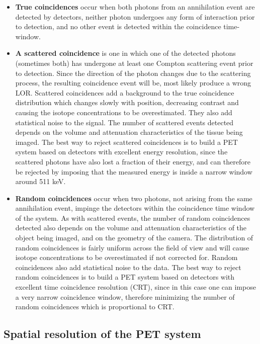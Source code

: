 \begin{itemize}
\item {\bf True coincidences} occur when both photons from an annihilation event are detected by detectors, neither photon undergoes any form of interaction prior to detection, and no other event is detected within the coincidence time-window.
\item {\bf A scattered coincidence} is one in which one of the detected photons (sometimes both) has undergone at least one Compton scattering event prior to detection. Since the direction of the photon changes due to the scattering process, the resulting coincidence event will be, most likely produce a wrong LOR. Scattered coincidences add a background to the true coincidence distribution which changes slowly with position, decreasing contrast and causing the isotope concentrations to be overestimated. They also add statistical noise to the signal. The number of scattered events detected depends on the volume and attenuation characteristics of the tissue being imaged. The best way to reject scattered coincidences is to build a PET system based on detectors with excellent energy resolution, since the scattered photons have also lost a fraction of their energy, and can therefore be rejected by imposing that the measured energy is inside a narrow window around 511 keV.
\item {\bf Random coincidences} occur when two photons, not arising from the same annihilation event, impinge the detectors within the coincidence time window of the system. As with scattered events, the number of random coincidences detected also depends on the volume and attenuation characteristics of the object being imaged, and on the geometry of the camera. The distribution of random coincidences is fairly uniform across the field of view and will cause isotope concentrations to be overestimated if not corrected for. Random coincidences also add statistical noise to the data. The best way to reject random coincidences is to build a PET system based on detectors with excellent time coincidence resolution (CRT), since in this case one can impose a very narrow coincidence window, therefore minimizing the number of random coincidences which is proportional to CRT. 
\end{itemize}


\subsection{Spatial resolution of the PET system}

